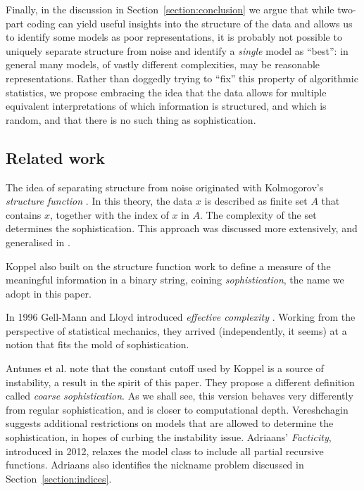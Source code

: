 \documentclass{style/llncs}
\begin{document}
Finally, in the discussion in Section~\ref{section:conclusion} we argue that while two-part coding can yield useful insights into the structure of the data and allows us to identify some models as poor representations, it is probably not possible to uniquely separate structure from noise and identify a \emph{single} model as ``best'': in general many models, of vastly different complexities, may be reasonable representations. Rather than doggedly trying to ``fix'' this property of algorithmic statistics, we propose embracing the idea that the data allows for multiple equivalent interpretations of which information is structured, and which is random, and that there is no such thing as sophistication.

\subsection{Related work}
The idea of separating structure from noise originated with Kolmogorov's \emph{structure function} \cite{cover1985kolmogorov}. In this theory, the data $x$ is described as finite set $A$ that contains $x$, together with the index of $x$ in $A$. The complexity of the set determines the sophistication. This approach was discussed more extensively, and generalised in \cite{vereshchagin2004kolmogorov,gacs2001algorithmic}. 

Koppel \cite{koppelSoph1988,koppel1991almost} also built on the structure function work to define a measure of the meaningful information in a binary string, coining \emph{sophistication}, the name we adopt in this paper. 

In 1996 Gell-Mann and Lloyd introduced \emph{effective complexity} \cite{gellmann1996information}. Working from the perspective of statistical mechanics, they arrived (independently, it seems) at a notion that fits the mold of sophistication.


Antunes et al. \cite{antunes2009sophistication} note that the constant cutoff used by Koppel is a source of instability, a result in the spirit of this paper. They propose a different definition called \emph{coarse sophistication}. As we shall see, this version behaves very differently from regular sophistication, and is closer to computational depth. Vereshchagin \cite{vereshchagin2013algorithmic} suggests additional restrictions on models that are allowed to determine the sophistication, in hopes of curbing the instability issue. Adriaans' \emph{Facticity}, introduced in 2012\cite{adriaans2012facticity}, relaxes the model class to include all partial recursive functions. Adriaans also identifies the nickname problem discussed in Section~\ref{section:indices}.
\end{document}
